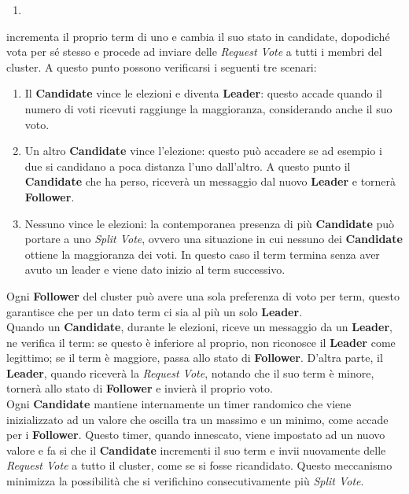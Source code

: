 \begin{enumerate}
	\item{}
\end{enumerate}
 incrementa il proprio term di uno e cambia il suo stato in candidate, dopodiché vota per sé stesso e procede ad inviare delle \textit{Request Vote} a tutti i membri del cluster.
A questo punto possono verificarsi i seguenti tre scenari:
\begin{enumerate}
	\item Il \textbf{Candidate} vince le elezioni e diventa \textbf{Leader}: questo accade quando il numero di voti ricevuti raggiunge la maggioranza, considerando anche il suo voto.
	\item Un altro \textbf{Candidate} vince l'elezione: questo può accadere se ad esempio i due si candidano a poca distanza l'uno dall'altro. A questo punto il \textbf{Candidate} che ha perso, riceverà un messaggio dal nuovo \textbf{Leader} e tornerà \textbf{Follower}.
	\item Nessuno vince le elezioni: la contemporanea presenza di più \textbf{Candidate} può portare a uno \textit{Split Vote}, ovvero una situazione in cui nessuno dei \textbf{Candidate} ottiene la maggioranza dei voti. In questo caso il term termina senza aver avuto un leader e viene dato inizio al term successivo.
\end{enumerate}
Ogni \textbf{Follower} del cluster può avere una sola preferenza di voto per term, questo garantisce che per un dato term ci sia al più un solo \textbf{Leader}. \\
Quando un \textbf{Candidate}, durante le elezioni, riceve un messaggio da un \textbf{Leader}, ne verifica il term: se questo è inferiore al proprio, non riconosce il \textbf{Leader} come legittimo; se il term è maggiore, passa allo stato di \textbf{Follower}.
D'altra parte, il \textbf{Leader}, quando riceverà la \textit{Request Vote}, notando che il suo term è minore, tornerà allo stato di \textbf{Follower} e invierà il proprio voto.
\\
Ogni \textbf{Candidate} mantiene internamente un timer randomico che viene inizializzato ad un valore che oscilla tra un massimo e un minimo, come accade per i \textbf{Follower}.
Questo timer, quando innescato, viene impostato ad un nuovo valore e fa si che il \textbf{Candidate} incrementi il suo term e invii nuovamente delle \textit{Request Vote} a tutto il cluster, come se si fosse ricandidato. Questo meccanismo minimizza la possibilità che si verifichino consecutivamente più \textit{Split Vote}.


